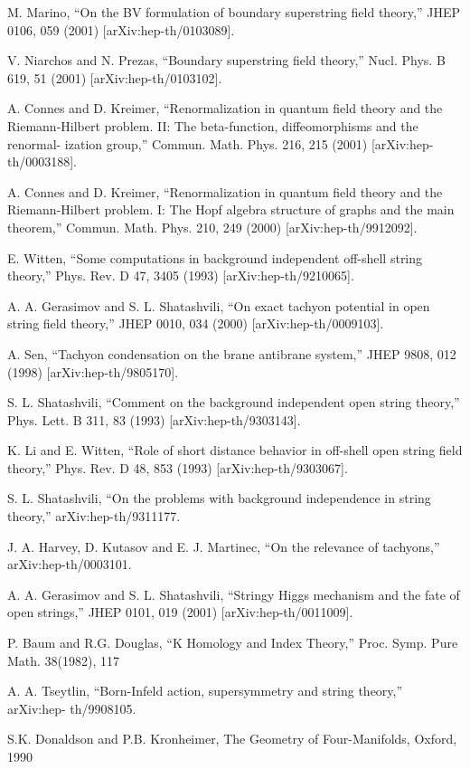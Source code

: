\documentclass[11pt,a4paper]{ctexart}
\begin{document}
\begin{enumerate}[label={[\arabic*]},leftmargin=*,itemsep=2pt]
\item M. Marino, “On the BV formulation of boundary superstring field theory,” JHEP 0106, 059 (2001) [arXiv:hep-th/0103089].
\item V. Niarchos and N. Prezas, “Boundary superstring field theory,” Nucl. Phys. B 619, 51 (2001) [arXiv:hep-th/0103102].
\item A. Connes and D. Kreimer, “Renormalization in quantum field theory and the Riemann-Hilbert problem. II: The beta-function, diffeomorphisms and the renormal- ization group,” Commun. Math. Phys. 216, 215 (2001) [arXiv:hep-th/0003188].
\item A. Connes and D. Kreimer, “Renormalization in quantum field theory and the Riemann-Hilbert problem. I: The Hopf algebra structure of graphs and the main theorem,” Commun. Math. Phys. 210, 249 (2000) [arXiv:hep-th/9912092].
\item E. Witten, “Some computations in background independent off-shell string theory,” Phys. Rev. D 47, 3405 (1993) [arXiv:hep-th/9210065].
\item A. A. Gerasimov and S. L. Shatashvili, “On exact tachyon potential in open string field theory,” JHEP 0010, 034 (2000) [arXiv:hep-th/0009103].
\item A. Sen, “Tachyon condensation on the brane antibrane system,” JHEP 9808, 012 (1998) [arXiv:hep-th/9805170].
\item S. L. Shatashvili, “Comment on the background independent open string theory,” Phys. Lett. B 311, 83 (1993) [arXiv:hep-th/9303143].
\item K. Li and E. Witten, “Role of short distance behavior in off-shell open string field theory,” Phys. Rev. D 48, 853 (1993) [arXiv:hep-th/9303067].
\item S. L. Shatashvili, “On the problems with background independence in string theory,” arXiv:hep-th/9311177.
\item J. A. Harvey, D. Kutasov and E. J. Martinec, “On the relevance of tachyons,” arXiv:hep-th/0003101.
\item A. A. Gerasimov and S. L. Shatashvili, “Stringy Higgs mechanism and the fate of open strings,” JHEP 0101, 019 (2001) [arXiv:hep-th/0011009].
\item P. Baum and R.G. Douglas, “K Homology and Index Theory,” Proc. Symp. Pure Math. 38(1982), 117
\item A. A. Tseytlin, “Born-Infeld action, supersymmetry and string theory,” arXiv:hep- th/9908105.
\item S.K. Donaldson and P.B. Kronheimer, The Geometry of Four-Manifolds, Oxford, 1990

\end{enumerate}
\end{document}

